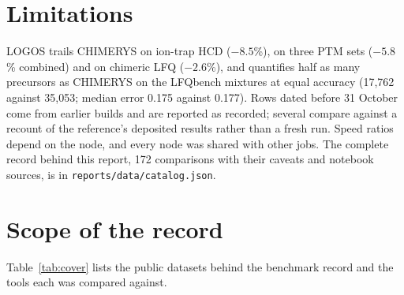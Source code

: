 \documentclass[10pt,a4paper]{article}
\begin{document}
\section{Limitations}
LOGOS trails CHIMERYS on ion-trap HCD ($-8.5$\%), on three PTM sets ($-5.8$\% combined) and on chimeric LFQ ($-2.6$\%), and quantifies half as many precursors as CHIMERYS on the LFQbench mixtures at equal accuracy (17,762 against 35,053; median error 0.175 against 0.177). Rows dated before 31 October come from earlier builds and are reported as recorded; several compare against a recount of the reference's deposited results rather than a fresh run. Speed ratios depend on the node, and every node was shared with other jobs. The complete record behind this report, 172 comparisons with their caveats and notebook sources, is in \texttt{reports/data/catalog.json}.

\section{Scope of the record}
Table~\ref{tab:cover} lists the public datasets behind the benchmark record and the tools each was compared against.
\end{document}
